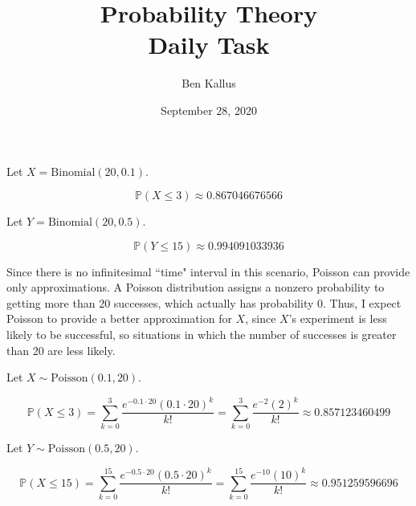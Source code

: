 \documentclass[12pt]{article}
\title{Probability Theory \\ Daily Task}
\author{Ben Kallus}
\date{September 28, 2020}
\begin{document}
\maketitle

 Let $X = \text{Binomial}(20,0.1)$.

    $$\mathbb P(X \leq 3) \approx 0.867046676566$$

 Let $Y = \text{Binomial}(20,0.5)$.

    $$\mathbb P(Y \leq 15) \approx 0.994091033936$$

 Since there is no infinitesimal ``time" interval in this scenario, Poisson can provide only approximations. A Poisson distribution assigns a nonzero probability to getting more than 20 successes, which actually has probability 0. Thus, I expect Poisson to provide a better approximation for $X$, since $X$'s experiment is less likely to be successful, so situations in which the number of successes is greater than 20 are less likely.

 Let $X \sim \text{Poisson}(0.1, 20)$.

    $$\mathbb P(X \leq 3) = \sum_{k=0}^3 \frac{e^{-0.1\cdot20}(0.1 \cdot 20)^k}{k!} = \sum_{k=0}^3 \frac{e^{-2}(2)^k}{k!} \approx 0.857123460499$$

 Let $Y \sim \text{Poisson}(0.5, 20)$.

    $$\mathbb P(X \leq 15) = \sum_{k=0}^{15} \frac{e^{-0.5\cdot20}(0.5 \cdot 20)^k}{k!} = \sum_{k=0}^{15} \frac{e^{-10}(10)^k}{k!} \approx 0.951259596696$$
    
\end{document}
